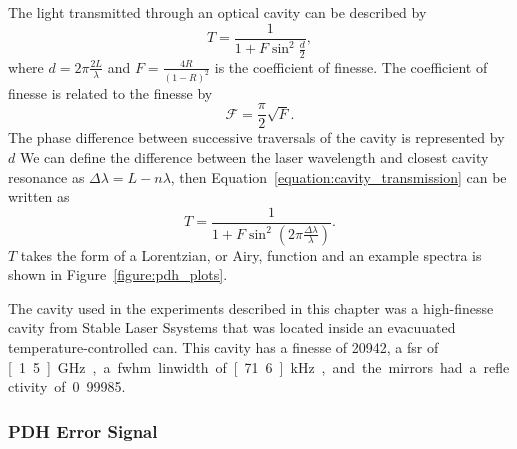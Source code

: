 {The light transmitted through an optical cavity can be described by~\cite{pedrotti_introduction_2007}
\begin{equation}\label{equation:cavity_transmission}
T = \frac{1}{1+F\sin^2\frac{d}{2}},
\end{equation}
where $d=2\pi\frac{2L}{\lambda}$ and $F=\frac{4R}{\left(1-R\right)^2}$ is the coefficient of finesse.
The coefficient of finesse is related to the finesse by
\begin{equation}
\mathscr{F}=\frac{\pi}{2}\sqrt{F}.
\end{equation}
The phase difference between successive traversals of the cavity is represented by $d$
We can define the difference between the laser wavelength and closest cavity resonance as $\Delta\lambda=L-n\lambda$, then Equation~\ref{equation:cavity_transmission} can be written as
\begin{equation}\label{equation:cavity_transmission}
T = \frac{1}{1+F\sin^2\left(2\pi\frac{\Delta\lambda}{\lambda}\right)}.
\end{equation}
$T$ takes the form of a Lorentzian, or Airy, function and an example spectra is shown in Figure~\ref{figure:pdh_plots}.

The cavity used in the experiments described in this chapter was a high-finesse cavity from Stable Laser Ssystems that was located inside an evacuuated temperature-controlled can.
This cavity has a finesse of 20942, a \gls{fsr} of \unit[1.5]{GHz}, a \gls{fwhm} linwidth of \unit[71.6]{kHz}, and the mirrors had a reflectivity of 0.99985.

\subsubsection{PDH Error Signal}

}
